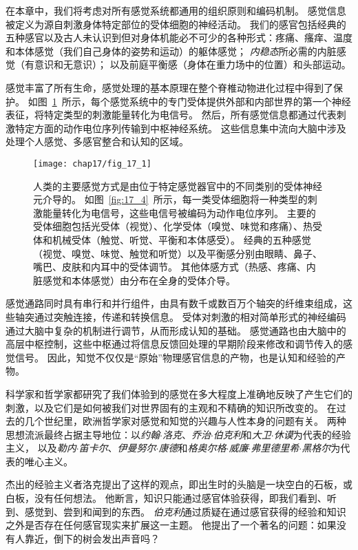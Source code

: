 在本章中，我们将考虑对所有感觉系统都通用的组织原则和编码机制。 
感觉信息被定义为源自刺激身体特定部位的受体细胞的神经活动。 
我们的感官包括经典的五种感官以及古人未认识到但对身体机能必不可少的各种形式：疼痛、瘙痒、温度和本体感觉（我们自己身体的姿势和运动）的躯体感觉； 
\textit{内稳态}所必需的内脏感觉（有意识和无意识）； 
以及前庭平衡感（身体在重力场中的位置）和头部运动。


感觉丰富了所有生命，感觉处理的基本原理在整个脊椎动物进化过程中得到了保护。
如图~\ref{fig:17_1}~所示，每个感觉系统中的专门受体提供外部和内部世界的第一个神经表征，将特定类型的刺激能量转化为电信号。
然后，所有感觉信息都通过代表刺激特定方面的动作电位序列传输到中枢神经系统。
这些信息集中流向大脑中涉及处理个人感觉、多感官整合和认知的区域。


\begin{figure}[htbp]
	\centering
	\texttt{[image: chap17/fig\_17\_1]}
	\caption{人类的主要感觉方式是由位于特定感觉器官中的不同类别的受体神经元介导的。 
		如图~\ref{fig:17_4}~所示，每一类受体细胞将一种类型的刺激能量转化为电信号，这些电信号被编码为动作电位序列。
		主要的受体细胞包括光受体（视觉）、化学受体（嗅觉、味觉和疼痛）、热受体和机械受体（触觉、听觉、平衡和本体感受）。 
		经典的五种感觉（视觉、嗅觉、味觉、触觉和听觉）以及平衡感分别由眼睛、鼻子、嘴巴、皮肤和内耳中的受体调节。 
		其他体感方式（热感、疼痛、内脏感觉和本体感觉）由分布在全身的受体介导。}
	\label{fig:17_1}
\end{figure}



感觉通路同时具有串行和并行组件，由具有数千或数百万个轴突的纤维束组成，这些轴突通过突触连接，传递和转换信息。 
受体对刺激的相对简单形式的神经编码通过大脑中复杂的机制进行调节，从而形成认知的基础。 
感觉通路也由大脑中的高层中枢控制，这些中枢通过将信息反馈回处理的早期阶段来修改和调节传入的感觉信号。 
因此，知觉不仅仅是“原始”物理感官信息的产物，也是认知和经验的产物。


科学家和哲学家都研究了我们体验到的感觉在多大程度上准确地反映了产生它们的刺激，以及它们是如何被我们对世界固有的主观和不精确的知识所改变的。 
在过去的几个世纪里，欧洲哲学家对感觉和知觉的兴趣与人性本身的问题有关。 
两种思想流派最终占据主导地位：以\textit{约翰$\cdot$洛克}、\textit{乔治$\cdot$伯克利}和\textit{大卫$\cdot$休谟}为代表的经验主义，
以及\textit{勒内$\cdot$笛卡尔}、\textit{伊曼努尔$\cdot$康德}和\textit{格奥尔格$\cdot$威廉$\cdot$弗里德里希$\cdot$黑格尔}为代表的唯心主义。


杰出的经验主义者洛克提出了这样的观点，即出生时的头脑是一块空白的石板，或白板，没有任何想法。
他断言，知识只能通过感官体验获得，即我们看到、听到、感觉到、尝到和闻到的东西。
\textit{伯克利}通过质疑在通过感官获得的经验和知识之外是否存在任何感官现实来扩展这一主题。
他提出了一个著名的问题：如果没有人靠近，倒下的树会发出声音吗？


